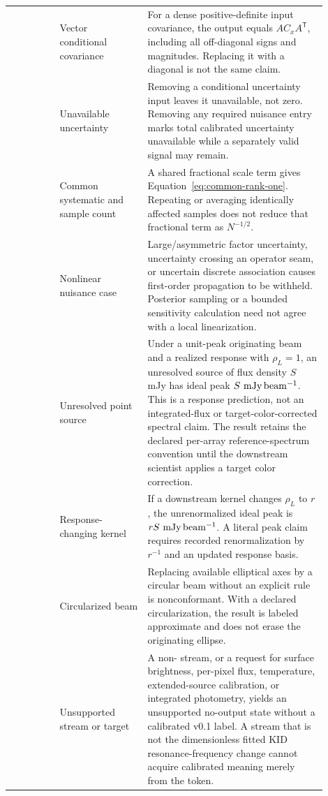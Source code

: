 \begin{longtable}{L{0.14\linewidth}L{0.25\linewidth}L{0.51\linewidth}}
 & Vector conditional covariance & For a dense positive-definite
input covariance, the output equals \(A C_xA^{\mathsf T}\), including all
off-diagonal signs and magnitudes. Replacing it with a diagonal is not the
same claim. \\

 & Unavailable uncertainty & Removing a conditional uncertainty
input leaves it unavailable, not zero. Removing any required nuisance entry
marks total calibrated uncertainty unavailable while a separately valid
signal may remain. \\

 & Common systematic and sample count & A shared fractional scale
term gives Equation~\eqref{eq:common-rank-one}. Repeating or averaging
identically affected samples does not reduce that fractional term as
\(N^{-1/2}\). \\

 & Nonlinear nuisance case & Large/asymmetric factor uncertainty,
uncertainty crossing an operator seam, or uncertain discrete association
causes first-order propagation to be withheld. Posterior sampling or a bounded
sensitivity calculation need not agree with a local linearization. \\

 & Unresolved point source & Under a unit-peak originating beam and
a realized response with \(\rho_L=1\), an unresolved source of flux density
\(S\) mJy has ideal peak \(S\ \mathrm{mJy\,beam^{-1}}\). This is a response prediction, not
an integrated-flux or target-color-corrected spectral claim. The result
retains the declared per-array reference-spectrum convention until the
downstream scientist applies a target color correction. \\

 & Response-changing kernel & If a downstream kernel changes
\(\rho_L\) to \(r\), the unrenormalized ideal peak is \(rS\ \mjybeam\). A
literal peak claim requires recorded renormalization by \(r^{-1}\) and an
updated response basis. \\

 & Circularized beam & Replacing available elliptical axes by a
circular beam without an explicit rule is nonconformant. With a declared
circularization, the result is labeled approximate and does not erase the
originating ellipse. \\

 & Unsupported stream or target & A non- stream, or a
request for surface brightness, per-pixel flux, temperature, extended-source
calibration, or integrated photometry, yields an unsupported no-output state
without a calibrated v0.1 label. A stream that is not the dimensionless fitted
KID resonance-frequency change cannot acquire calibrated meaning merely from
the  token. \\


\end{longtable}
